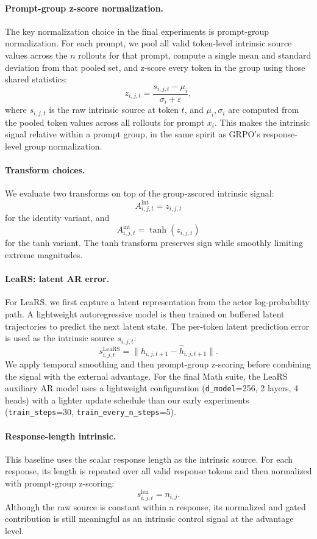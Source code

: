 \paragraph{Prompt-group z-score normalization.}
The key normalization choice in the final experiments is prompt-group normalization. For each prompt, we pool all valid token-level intrinsic source values across the \(n\) rollouts for that prompt, compute a single mean and standard deviation from that pooled set, and z-score every token in the group using those shared statistics:
\[
z_{i,j,t} = \frac{s_{i,j,t} - \mu_i}{\sigma_i + \varepsilon},
\]
where \(s_{i,j,t}\) is the raw intrinsic source at token \(t\), and \(\mu_i,\sigma_i\) are computed from the pooled token values across all rollouts for prompt \(x_i\). This makes the intrinsic signal relative within a prompt group, in the same spirit as GRPO's response-level group normalization.

\paragraph{Transform choices.}
We evaluate two transforms on top of the group-zscored intrinsic signal:
\[
A^{\mathrm{int}}_{i,j,t} = z_{i,j,t}
\]
for the identity variant, and
\[
A^{\mathrm{int}}_{i,j,t} = \tanh(z_{i,j,t})
\]
for the tanh variant. The tanh transform preserves sign while smoothly limiting extreme magnitudes.

\paragraph{LeaRS: latent AR error.}
For LeaRS, we first capture a latent representation from the actor log-probability path. A lightweight autoregressive model is then trained on buffered latent trajectories to predict the next latent state. The per-token latent prediction error is used as the intrinsic source \(s_{i,j,t}\):
\[
s_{i,j,t}^{\mathrm{LeaRS}} = \| h_{i,j,t+1} - \hat{h}_{i,j,t+1} \|.
\]
We apply temporal smoothing and then prompt-group z-scoring before combining the signal with the external advantage. For the final Math suite, the LeaRS auxiliary AR model uses a lightweight configuration (\texttt{d\_model}=256, 2 layers, 4 heads) with a lighter update schedule than our early experiments (\texttt{train\_steps}=30, \texttt{train\_every\_n\_steps}=5).

\paragraph{Response-length intrinsic.}
This baseline uses the scalar response length as the intrinsic source. For each response, its length is repeated over all valid response tokens and then normalized with prompt-group z-scoring:
\[
s_{i,j,t}^{\mathrm{len}} = n_{i,j}.
\]
Although the raw source is constant within a response, its normalized and gated contribution is still meaningful as an intrinsic control signal at the advantage level.

